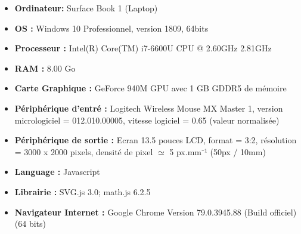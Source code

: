 \documentclass[a4paper, 12pt]{article}
\begin{document}
\begin{itemize}
    \item \textbf{Ordinateur: } Surface Book 1 (Laptop)
    \item \textbf{OS :} Windows 10 Professionnel, version 1809, 64bits %
    \item \textbf{Processeur :} Intel(R) Core(TM) i7-6600U CPU @ 2.60GHz 2.81GHz %
    \item \textbf{RAM :} 8.00 Go
    \item \textbf{Carte Graphique :} GeForce 940M GPU avec 1 GB GDDR5 de mémoire %
    \item \textbf{Périphérique d'entré :} Logitech Wireless Mouse MX Master 1, version micrologiciel = 012.010.00005, vitesse logiciel = 0.65 (valeur normalisée) %
    \item \textbf{Périphérique de sortie :} Ecran 13.5 pouces LCD, format = 3:2, résolution = 3000 x 2000 pixels, densité de pixel $\simeq$ 5 px.mm⁻¹ (50px / 10mm) %
    \item \textbf{Language :} Javascript
    \item \textbf{Librairie :} SVG.js 3.0; math.js 6.2.5
    \item \textbf{Navigateur Internet :} Google Chrome Version 79.0.3945.88 (Build officiel) (64 bits)%
\end{itemize}

\pagebreak
{}


\pagebreak
{}




\end{document}
